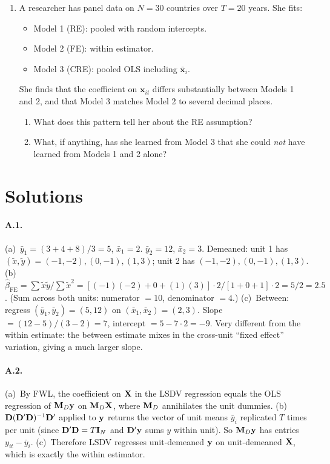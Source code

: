 \documentclass{article}
\begin{document}
\begin{enumerate}[label=\textbf{D.\arabic*},leftmargin=*,itemsep=10pt]
\item  A researcher has panel data on $N = 30$ countries over $T = 20$ years.  She fits:
\begin{itemize}
  \item Model 1 (RE): pooled with random intercepts.
  \item Model 2 (FE): within estimator.
  \item Model 3 (CRE): pooled OLS including $\bar{\bm x}_i$.
\end{itemize}
She finds that the coefficient on $\bm x_{it}$ differs substantially between Models 1 and 2, and that Model 3 matches Model 2 to several decimal places.
\begin{enumerate}[label=(\alph*)]
  \item What does this pattern tell her about the RE assumption?
  \item What, if anything, has she learned from Model 3 that she could \emph{not} have learned from Models 1 and 2 alone?
\end{enumerate}

\end{enumerate}

\newpage

\section*{Solutions}

\paragraph{A.1.}  (a)~$\bar y_1 = (3+4+8)/3 = 5$, $\bar x_1 = 2$.  $\bar y_2 = 12$, $\bar x_2 = 3$.  Demeaned: unit 1 has $(\tilde x, \tilde y) = (-1, -2), (0, -1), (1, 3)$; unit 2 has $(-1, -2), (0, -1), (1, 3)$.  (b)~$\hat\beta_{\text{FE}} = \sum\tilde x\tilde y/\sum\tilde x^2 = [(-1)(-2) + 0 + (1)(3)]\cdot 2 /[1 + 0 + 1]\cdot 2 = 5/2 = 2.5$.  (Sum across both units: numerator $= 10$, denominator $= 4$.)  (c)~Between: regress $(\bar y_1, \bar y_2) = (5, 12)$ on $(\bar x_1, \bar x_2) = (2, 3)$.  Slope $= (12 - 5)/(3 - 2) = 7$, intercept $= 5 - 7\cdot 2 = -9$.  Very different from the within estimate: the between estimate mixes in the cross-unit ``fixed effect'' variation, giving a much larger slope.

\paragraph{A.2.}  (a)~By FWL, the coefficient on ${\mathbf X}$ in the LSDV regression equals the OLS regression of ${\mathbf M}_D{\mathbf y}$ on ${\mathbf M}_D{\mathbf X}$, where ${\mathbf M}_D$ annihilates the unit dummies.  (b)~${\mathbf D}({\mathbf D}'{\mathbf D})^{-1}{\mathbf D}'$ applied to ${\mathbf y}$ returns the vector of unit means $\bar y_i$ replicated $T$ times per unit (since ${\mathbf D}'{\mathbf D} = T{\mathbf I}_N$ and ${\mathbf D}'{\mathbf y}$ sums $y$ within unit).  So ${\mathbf M}_D{\mathbf y}$ has entries $y_{it} - \bar y_i$.  (c)~Therefore LSDV regresses unit-demeaned ${\mathbf y}$ on unit-demeaned ${\mathbf X}$, which is exactly the within estimator.
\end{document}
